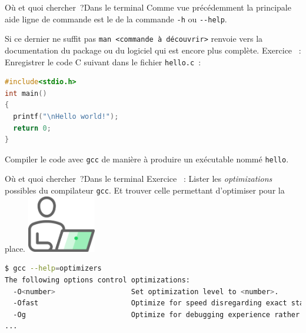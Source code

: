 \documentclass{beamer}
\begin{document}
    \begin{frame}[fragile]{Où et quoi chercher~?}{Dans le terminal}
        Comme vue précédemment la principale aide ligne de commande est le  de la commande \lstinline{-h} ou \lstinline{--help}.

        Si ce dernier ne suffit pas \lstinline{man <commande à découvrir>} renvoie vers la documentation du package ou du logiciel qui est encore plus complète.
        \bigbreak
        Exercice \execcounterdispinc~:
        Enregistrer le code C suivant dans le fichier \lstinline{hello.c}~:
        \begin{lstlisting}[language=C]
#include<stdio.h>
int main()
{
  printf("\nHello world!");
  return 0;
}
        \end{lstlisting}
        Compiler le code avec \lstinline{gcc} de manière à produire un exécutable nommé \lstinline{hello}.
        \bigbreak
    \end{frame}

    \begin{frame}[fragile]{Où et quoi chercher~?}{Dans le terminal}
        Exercice \execcounterdispinc~:
        Lister les \textit{optimizations} possibles du compilateur \lstinline{gcc}.
        Et trouver celle permettant d'optimiser pour la place.
        \bigbreak
        \centering
        \includegraphics[width=3cm]{image/guy-in-front-of-desktop}
        \pause
        \begin{lstlisting}[language=bash]
$ gcc --help=optimizers
The following options control optimizations:
  -O<number>                  Set optimization level to <number>.
  -Ofast                      Optimize for speed disregarding exact standards compliance.
  -Og                         Optimize for debugging experience rather than speed or size.
...
        \end{lstlisting}
    \end{frame}
\end{document}

